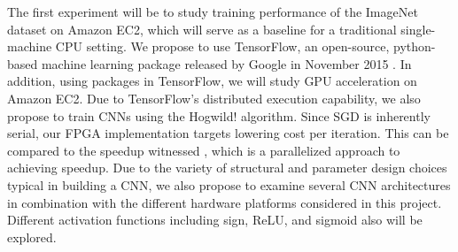 The first experiment will be to study training performance of the ImageNet dataset on Amazon EC2, which will serve as a baseline for a traditional single-machine CPU setting.  We propose to use TensorFlow, an open-source, python-based machine learning package released by Google in November 2015 \cite{tensorflow}.  In addition, using packages in TensorFlow, we will study GPU acceleration on Amazon EC2.  Due to TensorFlow’s distributed execution capability, we also propose to train CNNs using the Hogwild! algorithm.  Since SGD is inherently serial, our FPGA implementation targets lowering cost per iteration.  This can be compared to the speedup witnessed , which is a parallelized approach to achieving speedup.  Due to the variety of structural and parameter design choices typical in building a CNN, we also propose to examine several CNN architectures in combination with the different hardware platforms considered in this project.  Different activation functions including sign, ReLU, and sigmoid also will be explored.
